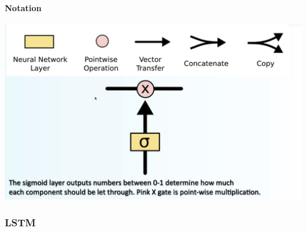 \documentclass[10pt]{report}
\begin{document}
\paragraph{Notation}\begin{center}
	\includegraphics[scale=0.33]{30.png}
\end{center}
\subsubsection{LSTM}
\end{document}
